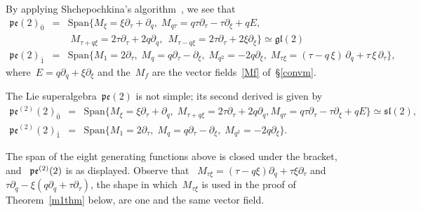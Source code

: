 \documentclass[12pt,a4paper]{amsart}
\theoremstyle{thm}
\theoremstyle{definition}
\begin{document}
\label{real} By applying Shchepochkina's algorithm~\cite{Sh}, we see that
\[
\begin{array}{ccl}
\mathfrak{pe}(2)_{\bar 0}&=&\mathrm{Span} \{ M_{\xi}=\xi \partial_\tau+\partial_q , \; M_{q \tau }=q \tau\partial_{\tau}-\tau\partial_{\xi}+qE, \\
&&\; M_{\tau+q\xi}=2 \tau\partial_\tau+2 q\partial_q, \ \ M_{\tau -q\xi}=2 \tau \partial_\tau+2\xi\partial_{\xi} \}\simeq \mathfrak{gl}(2)\\[2mm]

\mathfrak{pe}(2)_{\bar 1}&=&\mathrm{Span} \{M_1=2 \partial_\tau , \; M_q=q \partial_\tau-\partial_\xi, \; M_{q^2}=-2 q \partial_\xi, \; M_{\tau \xi}=(\tau-q\, \xi ) \, \partial_q + \tau \, \xi\, \partial_\tau \},
\end{array}
\]
where~$E=q\partial_q+\xi\partial_\xi$ and the~$M_f$ are the vector fields~\eqref{Mf} of~\S\ref{convm}.

The Lie superalgebra~$\mathfrak{pe}(2)$ is not simple; its second derived is given by
\[
\begin{array}{ccl}
\mathfrak{pe}^{(2)}(2)_{\bar 0}&=&\mathrm{Span} \{ M_{\xi}=\xi \partial_\tau+\partial_q, \; M_{\tau+q\xi}=2 \tau\partial_\tau+2 q\partial_q, M_{q \tau }=q \tau\partial_{\tau}-\tau\partial_{\xi}+qE \} \simeq\mathfrak{sl}(2),\\[2mm]
\mathfrak{pe}^{(2)}(2)_{\bar 1}&=&\mathrm{Span} \{M_1=2 \partial_\tau, \; M_q=q \partial_\tau-\partial_\xi, \; M_{q^2}=-2 q \partial_\xi \}.
\end{array}
\]

The span of the eight generating functions above is closed under the bracket, and~%
${\mathfrak{pe}}^{(2)}(2)$ is as displayed. Observe that~%
$M_{\tau\xi}=(\tau-q\xi)\partial_q+\tau\xi\partial_\tau$ and~%
$\tau\partial_q-\xi(q\partial_q+\tau\partial_\tau)$, the shape in which~$M_{\tau\xi}$ is used
in the proof of Theorem~\ref{m1thm} below, are one and the same vector field.
\end{document}
